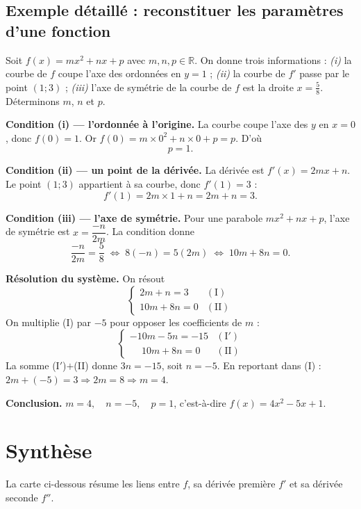 \documentclass[11pt,a4paper]{article}
\newcommand{\R}{\mathbb{R}}
\begin{document}
\subsection{Exemple détaillé : reconstituer les paramètres d'une fonction}

\begin{exemple}[Trouver $m$, $n$, $p$ pour $f(x)=mx^2+nx+p$]
Soit $f(x)=mx^2+nx+p$ avec $m,n,p\in\R$. On donne trois informations :
\emph{(i)} la courbe de $f$ coupe l'axe des ordonnées en $y=1$ ;
\emph{(ii)} la courbe de $f'$ passe par le point $(1;3)$ ;
\emph{(iii)} l'axe de symétrie de la courbe de $f$ est la droite $x=\tfrac58$.
Déterminons $m$, $n$ et $p$.

\medskip
\textbf{Condition (i) — l'ordonnée à l'origine.} La courbe coupe l'axe des $y$ en $x=0$, donc
$f(0)=1$. Or $f(0)=m\times 0^2+n\times 0+p=p$. D'où
\[
   \boxed{p=1}.
\]

\textbf{Condition (ii) — un point de la dérivée.} La dérivée est $f'(x)=2mx+n$. Le point $(1;3)$
appartient à sa courbe, donc $f'(1)=3$ :
\[
   f'(1)=2m\times 1+n=2m+n=3. \tag{I}
\]

\textbf{Condition (iii) — l'axe de symétrie.} Pour une parabole $mx^2+nx+p$, l'axe de symétrie est
$x=\dfrac{-n}{2m}$. La condition donne
\[
   \frac{-n}{2m}=\frac58 \;\Longleftrightarrow\; 8(-n)=5(2m) \;\Longleftrightarrow\; 10m+8n=0. \tag{II}
\]

\textbf{Résolution du système.} On résout
\[
   \begin{cases} 2m+n=3 & (\mathrm{I})\\ 10m+8n=0 & (\mathrm{II})\end{cases}
\]
On multiplie (I) par $-5$ pour opposer les coefficients de $m$ :
\[
   \begin{cases} -10m-5n=-15 & (\mathrm{I'})\\ \phantom{-}10m+8n=0 & (\mathrm{II})\end{cases}
\]
La somme (I$'$)$+$(II) donne $3n=-15$, soit $n=-5$. En reportant dans (I) :
$2m+(-5)=3\Rightarrow 2m=8\Rightarrow m=4$.

\medskip
\textbf{Conclusion.} $\boxed{m=4,\quad n=-5,\quad p=1}$, c'est-à-dire $f(x)=4x^2-5x+1$.
\end{exemple}

\section{Synthèse}
\label{sec:carte}
La carte ci-dessous résume les liens entre $f$, sa dérivée première $f'$ et sa dérivée seconde $f''$.
\end{document}
